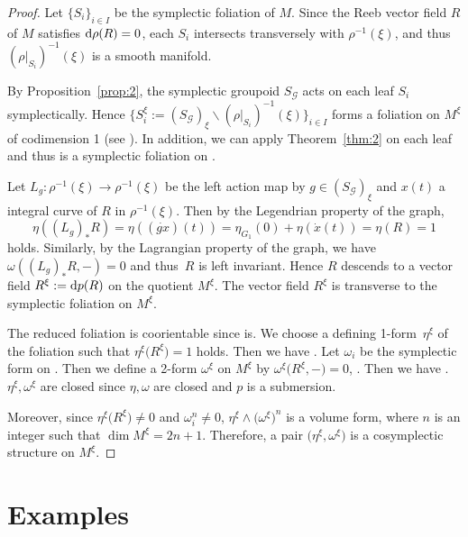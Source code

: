 \documentclass[10pt,a4paper]{amsart}
\numberwithin{equation}{section}
\begin{document}
\begin{proof}
 Let $\{S_i\}_{i\in I}$ be the symplectic foliation of $M$. Since the Reeb vector field $R$ of $M$ satisfies ${\rm d}\rho(R)=0$, each $S_i$ intersects transversely with $\rho^{-1}(\xi)$, and thus $(\rho|_{S_i})^{-1}(\xi)$ is a smooth manifold.

 By Proposition~\ref{prop:2}, the symplectic groupoid $S_\mathcal{G}$ acts on each leaf $S_i$ symplectically. Hence $\big\{S^\xi_i:=(S_{\mathcal{G}})_\xi\backslash (\rho|_{S_i})^{-1}(\xi)\big\}_{i\in I}$ forms a foliation on $M^\xi$ of codimension 1 (see \cite[Section 1.3]{moerdijk2003introduction}). In addition, we can apply Theorem~\ref{thm:2} on each leaf and thus  is a symplectic foliation on .

 Let $L_g\colon\rho^{-1}(\xi)\to\rho^{-1}(\xi)$ be the left action map by $g\in(S_{\mathcal{G}})_\xi$ and $x(t)$ a integral curve of $R$ in $\rho^{-1}(\xi)$. Then by the Legendrian property of the graph,
 \[\eta((L_g)_\ast R)=\eta((\dot{gx})(t))=\eta_{G_1}(0)+\eta(\dot{x}(t))=\eta(R)=1\]holds. Similarly, by the Lagrangian property of the graph, we have $\omega((L_g)_\ast R,-)=0$ and thus~$R$ is left invariant. Hence $R$ descends to a vector field ${R}^\xi:={\rm d}p(R)$ on the quotient $M^\xi$. The vector field ${R}^\xi$ is transverse to the symplectic foliation on $M^\xi$.

 The reduced foliation  is coorientable since  is. We choose a defining 1-form~$\eta^\xi$ of the foliation  such that $\eta^\xi\bigl(R^\xi\bigr)=1$ holds. Then we have . Let $\omega_i$ be the symplectic form on . Then we define a 2-form $\omega^\xi$ on $M^\xi$ by
 $\omega^\xi\bigl(R^\xi,-\bigr)=0$, . Then we have . $\eta^\xi,\omega^\xi$ are closed since $\eta,\omega$ are closed and $p$ is a submersion.

 Moreover, since $\eta^\xi\bigl(R^\xi\bigr)\neq0$ and $\omega_i^n\neq0$, $\eta^\xi\wedge\bigl(\omega^\xi\bigr)^n$ is a volume form, where $n$ is an integer such that $\dim M^\xi=2n+1$. Therefore, a pair $\bigl(\eta^\xi,\omega^\xi\bigr)$ is a cosymplectic structure on $M^\xi$.
\end{proof}


\section{Examples}\label{examples}
\end{document}
